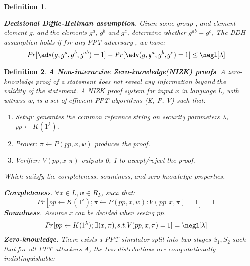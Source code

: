 \documentclass{article}
\newtheorem{myDef}{Definition}
\begin{document}
\begin{myDef}
\label{d:ddh}

\textbf{Decisional Diffie-Hellman assumption}. Given some group \GG, and element element $g$, and the elements $g^a$, $g^b$ and $g^{c}$, determine whether $g^{ab} = g^c$, The DDH assumption holds if for any PPT adversary \adv, we have: 
\begin{equation}
    Pr[\adv(g, g^a, g^b, g^{ab}) = 1] - Pr[\adv(g, g^a, g^b, g^c) = 1] \leq \negl[\lambda]
\end{equation}

\end{myDef}

\begin{myDef}
\label{d:zkp}
\textbf{A Non-interactive Zero-knowledge(NIZK) proofs}. A zero-knowledge proof of a statement does not reveal any information beyond the validity of the statement. A NIZK proof system for input $x$ in language L, with witness $w$, is a set of efficient PPT algorithms (K, P, V) such that:
\begin{enumerate}
    \item Setup: generates the common reference string on security parameters $\lambda$, $pp \gets K(1^\lambda)$.
    \item Prover: $\pi \gets P(pp, x, w)$ produces the proof.
    \item Verifier: $V (pp, x, \pi)$ outputs {0, 1} to accept/reject the proof.
\end{enumerate}
Which satisfy the completeness, soundness, and zero-knowledge properties. 

\noindent\textbf{Completeness}. $\forall x \in L, w \in R_L$, such that:
\begin{equation}
    Pr[pp \gets K(1^{\lambda}); \pi \gets P(pp, x, w): V(pp, x, \pi) = 1] = 1
\end{equation}
\noindent\textbf{Soundness}. Assume x can be decided when seeing $pp$.
\begin{equation}
    Pr[pp \gets K(1^{\lambda}); \exists (x,\pi), s.t. V(pp, x, \pi) = 1] = \negl[\lambda]
\end{equation}
\noindent\textbf{Zero-knowledge}. There exists a PPT simulator split into two stages $S_1, S_2$ such that for all PPT attackers $A$, the two distributions are computationally indistinguishable:

\begin{pchstack}
\end{pchstack}


\end{myDef}
\end{document}
